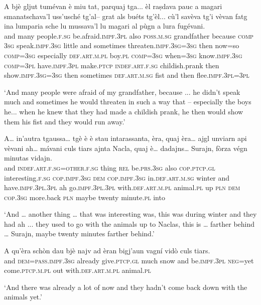 \begin{linenumbers}
\gll  A bjè gljut tumévan è miu tat, parquaj tga... èl raṣdava pauc a magari smanatschava’l uss'usché tg’al– grat als buéts tg’èl... cù’l savèva tg’i vèvan fatg ina lumparia sche lu mussava’l lu magari al pùgn a lura fugévani.  \\
and many people.\textsc{f.sg} be.afraid.\textsc{impf.3pl} also \textsc{poss.m.sg} grandfather because \textsc{comp} \textsc{3sg} speak.\textsc{impf.3sg} little and sometimes threaten.\textsc{impf.3sg=3sg} then now=so  \textsc{comp=3sg} especially  \textsc{def.art.m.pl} boy.\textsc{pl} \textsc{comp=3sg} when=\textsc{3sg}  know.\textsc{impf.3sg} \textsc{comp=3pl} have.\textsc{impf.3pl} make.\textsc{ptcp} \textsc{indef.art.f.sg} childish.prank then show.\textsc{impf.3sg=3sg} then sometimes \textsc{def.art.m.sg} fist and then  flee.\textsc{impf.3pl=3pl} \\
\end{linenumbers}
\medskip
\glt `And many people were afraid of my grandfather, because ... he didn’t speak much and sometimes he would threaten in such a way that – especially the boys he... when he knew that they had made a childish prank, he then would show them his fist and they would run away.'
\medskip

\begin{linenumbers}
\gll  A… in’autra tgaussa… tgè è è stau intarassanta, èra, quaj èra… ajgl unviarn api vèvani ah… mávani culs tiars ajnta Nacla, quaj è…  dadajns… Surajn, fòrza végn minutas vidajn.    \\
and \textsc{indef.art.f.sg=}\textsc{other.f.sg} thing \textsc{rel} be.\textsc{prs.3sg} also \textsc{cop.ptcp.gl} interesting.\textsc{f.sg} \textsc{cop.impf.3sg} \textsc{dem} \textsc{cop.impf.3sg}  in.\textsc{def.art.m.sg} winter and  have.\textsc{impf.3pl.3pl} ah go.\textsc{impf.3pl.3pl} with.\textsc{def.art.m.pl} animal.\textsc{pl} up \textsc{pln} \textsc{dem} \textsc{cop.3sg} more.back \textsc{pln} maybe twenty minute.\textsc{pl} into \\
\end{linenumbers}
\medskip
\glt `And … another thing … that was interesting was, this was during winter and they had ah ... they used to go with the animals up to Naclas, this is … farther behind … Surajn, maybe twenty minutes farther behind.'
\medskip

\begin{linenumbers}
\gll A qu'èra schòn dau bjè najv ad èran bigj’aun vagní vidò culs tiars.\\  
and \textsc{dem}=\textsc{pass.impf.3sg} already give.\textsc{ptcp.gl} much snow and be.\textsc{impf.3pl} \textsc{neg=}yet come.\textsc{ptcp.m.pl} out with.\textsc{def.art.m.pl} animal.\textsc{pl} \\
 \end{linenumbers}
\medskip
\glt `And there was already a lot of now and they hadn’t come back down with the animals yet.'
\medskip

